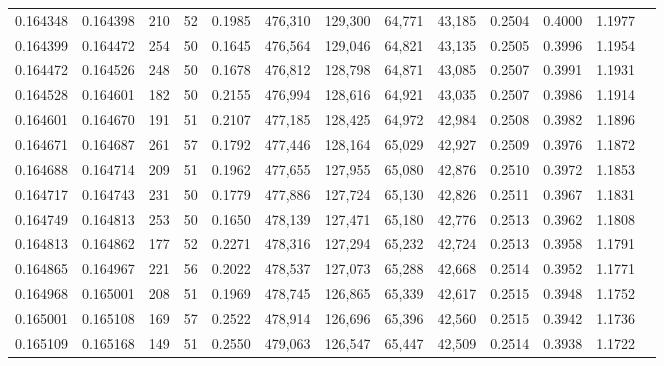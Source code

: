 \begin{tabular}{rrrrrrrrrrrrr}
0.164348 & 0.164398 &   210 &  52 &                                     0.1985 & 476,310 & 129,300 &  64,771 &  43,185 & 0.2504 & 0.4000 & 1.1977 \\
0.164399 & 0.164472 &   254 &  50 &                                     0.1645 & 476,564 & 129,046 &  64,821 &  43,135 & 0.2505 & 0.3996 & 1.1954 \\
0.164472 & 0.164526 &   248 &  50 &                                     0.1678 & 476,812 & 128,798 &  64,871 &  43,085 & 0.2507 & 0.3991 & 1.1931 \\
0.164528 & 0.164601 &   182 &  50 &                                     0.2155 & 476,994 & 128,616 &  64,921 &  43,035 & 0.2507 & 0.3986 & 1.1914 \\
0.164601 & 0.164670 &   191 &  51 &                                     0.2107 & 477,185 & 128,425 &  64,972 &  42,984 & 0.2508 & 0.3982 & 1.1896 \\
0.164671 & 0.164687 &   261 &  57 &                                     0.1792 & 477,446 & 128,164 &  65,029 &  42,927 & 0.2509 & 0.3976 & 1.1872 \\
0.164688 & 0.164714 &   209 &  51 &                                     0.1962 & 477,655 & 127,955 &  65,080 &  42,876 & 0.2510 & 0.3972 & 1.1853 \\
0.164717 & 0.164743 &   231 &  50 &                                     0.1779 & 477,886 & 127,724 &  65,130 &  42,826 & 0.2511 & 0.3967 & 1.1831 \\
0.164749 & 0.164813 &   253 &  50 &                                     0.1650 & 478,139 & 127,471 &  65,180 &  42,776 & 0.2513 & 0.3962 & 1.1808 \\
0.164813 & 0.164862 &   177 &  52 &                                     0.2271 & 478,316 & 127,294 &  65,232 &  42,724 & 0.2513 & 0.3958 & 1.1791 \\
0.164865 & 0.164967 &   221 &  56 &                                     0.2022 & 478,537 & 127,073 &  65,288 &  42,668 & 0.2514 & 0.3952 & 1.1771 \\
0.164968 & 0.165001 &   208 &  51 &                                     0.1969 & 478,745 & 126,865 &  65,339 &  42,617 & 0.2515 & 0.3948 & 1.1752 \\
0.165001 & 0.165108 &   169 &  57 &                                     0.2522 & 478,914 & 126,696 &  65,396 &  42,560 & 0.2515 & 0.3942 & 1.1736 \\
0.165109 & 0.165168 &   149 &  51 &                                     0.2550 & 479,063 & 126,547 &  65,447 &  42,509 & 0.2514 & 0.3938 & 1.1722 \\

\end{tabular}
